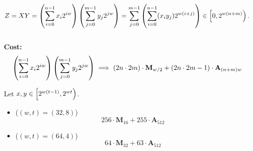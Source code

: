 \begin{align*}
Z=XY=\of{\sum_{i=0}^{n-1}x_i2^{iw}}\of{\sum_{j=0}^{m-1}y_j2^{jw}}=\sum_{j=0}^{m-1}\of{\sum_{i=0}^{n-1}(x_iy_j)2^{w(i+j)}}\in\intco{0,2^{w(n+m)}}.
\end{align*}
\\
\textbf{Cost:} \[
\left(\sum_{i=0}^{n-1}x_i2^{iw}\right)\left(\sum_{j=0}^{m-1}y_j2^{jw}\right)\implies\left(2n\cdot 2m\right)\cdot\textbf{M}_{w/2} + (2n\cdot 2m - 1)\cdot\textbf{A}_{(n+m)w}
\]

\begin{example}
Let $x,y\in\intco{2^{w(t-1)},2^{wt}}$.
\begin{itemize}
\item[] ($(w,t)=(32,8)$) \[
256\cdot\textbf{M}_{16} + 255\cdot\textbf{A}_{512}
\]
\item[] ($(w,t)=(64,4)$) \[
64\cdot\textbf{M}_{32} + 63\cdot\textbf{A}_{512}
\]
\end{itemize}
\end{example}

